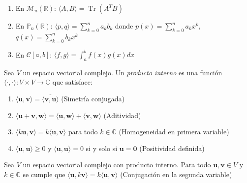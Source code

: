 \begin{rem}
\begin{enumerate}[1.]
    \item En $\mathcal{M}_n(\mathbb{R})$: $\langle A, B \rangle = \operatorname{Tr}(A^T B)$
    \item En $\mathbb{P}_n(\mathbb{R})$: $\langle p, q \rangle = \sum_{k=0}^n a_k b_k$ donde $p(x) = \sum_{k=0}^n a_k x^k$, $q(x) = \sum_{k=0}^n b_k x^k$
    \item En $\mathcal{C}[a,b]$: $\langle f, g \rangle = \int_a^b f(x)g(x)  dx$
\end{enumerate}
\end{rem}

\begin{definition}
Sea $V$ un espacio vectorial complejo. Un \textit{producto interno} es una función $\langle \cdot, \cdot \rangle: V \times V \to \mathbb{C}$ que satisface:
\begin{enumerate}[$1.$]
    \item $\langle \mathbf{u}, \mathbf{v} \rangle = \overline{\langle \mathbf{v}, \mathbf{u} \rangle}$ (Simetría conjugada)
    \item $\langle \mathbf{u} + \mathbf{v}, \mathbf{w} \rangle = \langle \mathbf{u}, \mathbf{w} \rangle + \langle \mathbf{v}, \mathbf{w} \rangle$  (Aditividad)
    \item $\langle k\mathbf{u}, \mathbf{v} \rangle = k\langle \mathbf{u}, \mathbf{v} \rangle$ para todo $k \in \mathbb{C}$ (Homogeneidad en primera variable)
    \item $\langle \mathbf{u}, \mathbf{u} \rangle \geq 0$ y $\langle \mathbf{u}, \mathbf{u} \rangle = 0$ si y solo si $\mathbf{u} = \mathbf{0}$ (Positividad definida)
\end{enumerate}
\end{definition}

\begin{theorem}
Sea $V$ un espacio vectorial complejo con producto interno. Para todo $\mathbf{u}, \mathbf{v} \in V$ y $k \in \mathbb{C}$ se cumple que $\langle \mathbf{u}, k\mathbf{v} \rangle = \overline{k} \langle \mathbf{u}, \mathbf{v} \rangle$ (Conjugación en la segunda variable)
\end{theorem}

